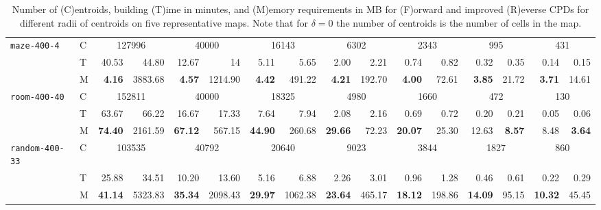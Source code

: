\begin{table}[bt]
\begin{tabular}{ll|r@{~}rr@{~}rr@{~}rr@{~}rr@{~}rr@{~}rr@{~}r}
\tt maze-400-4 &C &\multicolumn{2}{c}{127996}&\multicolumn{2}{c}{40000}&\multicolumn{2}{c}{16143}&\multicolumn{2}{c}{6302}&\multicolumn{2}{c}{2343}&\multicolumn{2}{c}{995}&\multicolumn{2}{c}{431}\\ 
             &T &   40.53 & 44.80 & 12.67 & 14 & 5.11 & 5.65 &  2.00  & 2.21 & 0.74 & 0.82 &  0.32 & 0.35 & 0.14 & 0.15\\
             &M & \textbf{4.16}  & 3883.68 &  \textbf{4.57}  & 1214.90& \textbf{4.42}   & 491.22 & \textbf{4.21 }   & 192.70& \textbf{4.00 }   & 72.61 &\textbf{3.85}   & 21.72 & \textbf{3.71}   & 14.61 \\ \hline

\tt room-400-40 &C &\multicolumn{2}{c}{152811}&\multicolumn{2}{c}{40000}&\multicolumn{2}{c}{18325}&\multicolumn{2}{c}{4980}&\multicolumn{2}{c}{1660}&\multicolumn{2}{c}{472}&\multicolumn{2}{c}{130}\\ 
             &T &  63.67 & 66.22 & 16.67 & 17.33 & 7.64 & 7.94 & 2.08 & 2.16  & 0.69 & 0.72 & 0.20 & 0.21 & 0.05 & 0.06 \\
             &M &  \textbf{74.40 } & 2161.59 & \textbf{67.12}   & 567.15 & \textbf{44.90}   & 260.68 &\textbf{ 29.66 }  & 72.23 & \textbf{20.07 }  & 25.30 & 12.63  & \textbf{8.57 } & 8.48    & \textbf{3.64} \\ \hline
             
\tt random-400-33&C &\multicolumn{2}{c}{103535}&\multicolumn{2}{c}{40792}&\multicolumn{2}{c}{20640}&\multicolumn{2}{c}{9023}&\multicolumn{2}{c}{3844}&\multicolumn{2}{c}{1827}&\multicolumn{2}{c}{860}\\ 
             &T &  25.88 & 34.51 &  10.20  & 13.60 & 5.16 & 6.88 &2.26 & 3.01 & 0.96 & 1.28 & 0.46 & 0.61  & 0.22  & 0.29\\
             &M & \textbf{41.14 }  & 5323.83 & \textbf{35.34 }  & 2098.43& \textbf{29.97 }  & 1062.38& \textbf{23.64}   & 465.17& \textbf{18.12}   & 198.86& \textbf{14.09}   & 95.15 & \textbf{10.32}   & 45.45 \\

\bottomrule
\end{tabular}
    \caption{Number of (C)entroids, building (T)ime in minutes, and (M)emory requirements in MB for (F)orward and improved (R)everse CPDs for different radii of centroids on five representative maps.
    Note that for $\delta=0$ the number of centroids is the number of cells in the map.}
    \label{tab:cpdinfo}
\end{table}

